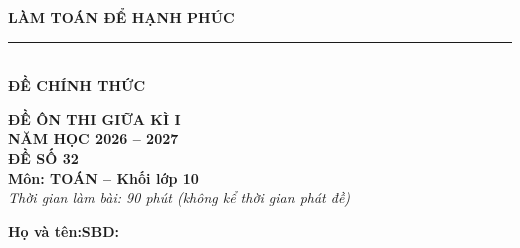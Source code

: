 \documentclass[12pt,a4paper]{article}
\begin{document}
\noindent
\begin{minipage}[c]{0.38\textwidth}
    \centering
    \textbf{LÀM TOÁN ĐỂ HẠNH PHÚC}\\[-2pt]
    \rule{3.2cm}{0.6pt}\\[3pt]
    \textbf{ĐỀ CHÍNH THỨC}
\end{minipage}\hfill
\begin{minipage}[c]{0.35\textwidth}
    \centering
    \textbf{ĐỀ ÔN THI GIỮA KÌ I}\\
    \textbf{NĂM HỌC 2026 -- 2027}\\[2pt]
    \textbf{ĐỀ SỐ 32}\\
    \textbf{Môn: TOÁN -- Khối lớp 10}\\
    \textit{\small Thời gian làm bài: 90 phút (không kể thời gian phát đề)}
\end{minipage}

\vspace{0.03cm}
\noindent
\begin{minipage}[b]{0.78\textwidth}
    \textbf{Họ và tên:}\dotfill\textbf{SBD:}\makebox[3.5cm]{\dotfill}
\end{minipage}\hfill
\begin{minipage}[b]{0.20\textwidth}
    \hfill
    \setlength{\fboxrule}{0.8pt}%
\end{minipage}
\vspace{0.03cm}
\end{document}
